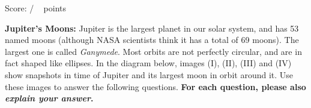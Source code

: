 \documentclass[addpoints,12pt]{exam}
\begin{document}
\begin{flushright}
Score: \hspace{0.2in} / \numpoints ~ points
\end{flushright}

\begin{questions}
\question \textbf{Jupiter's Moons:} Jupiter is the largest planet in our solar system, and has 53 named moons (although NASA scientists think it has a total of 69 moons). The largest one is called \textit{Ganymede}. Most orbits are not perfectly circular, and are in fact shaped like ellipses. In the diagram below, images (I), (II), (III) and (IV) show snapshots in time of Jupiter and its largest moon in orbit around it. Use these images to answer the following questions. \textbf{For each question, please also \textit{explain your answer}.}

\begin{center}\end{center}



\end{questions}
\end{document}
